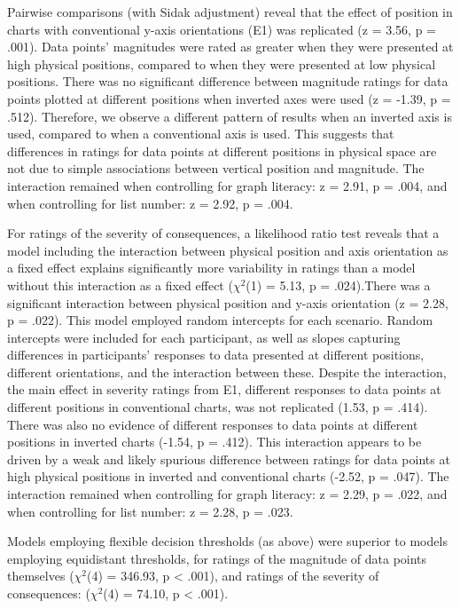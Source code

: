 \documentclass[journal]{vgtc}                %
\begin{document}
Pairwise comparisons (with Sidak adjustment) reveal that the effect of
position in charts with conventional y-axis orientations (E1) was
replicated (z = 3.56, p
= .001). Data points'
magnitudes were rated as greater when they were presented at high
physical positions, compared to when they were presented at low physical
positions. There was no significant difference between magnitude ratings
for data points plotted at different positions when inverted axes were
used (z = -1.39, p
= .512). Therefore, we
observe a different pattern of results when an inverted axis is used,
compared to when a conventional axis is used. This suggests that
differences in ratings for data points at different positions in
physical space are not due to simple associations between vertical
position and magnitude. The interaction remained when controlling for
graph literacy: z = 2.91, p
= .004, and when controlling for
list number: z = 2.92, p
= .004.

For ratings of the severity of consequences, a likelihood ratio test
reveals that a model including the interaction between physical position
and axis orientation as a fixed effect explains significantly more
variability in ratings than a model without this interaction as a fixed
effect (\(\chi^2\)(1) = 5.13, p
= .024).There was a significant
interaction between physical position and y-axis orientation (z =
2.28, p
= .022). This
model employed random intercepts for each scenario. Random intercepts
were included for each participant, as well as slopes capturing
differences in participants' responses to data presented at different
positions, different orientations, and the interaction between these.
Despite the interaction, the main effect in severity ratings from E1,
different responses to data points at different positions in
conventional charts, was not replicated
(1.53, p
= .414). There was also
no evidence of different responses to data points at different positions
in inverted charts (-1.54, p
= .412). This
interaction appears to be driven by a weak and likely spurious
difference between ratings for data points at high physical positions in
inverted and conventional charts (-2.52,
p = .047). The
interaction remained when controlling for graph literacy: z =
2.29, p
= .022, and when controlling for
list number: z = 2.28, p
= .023.

Models employing flexible decision thresholds (as above) were superior
to models employing equidistant thresholds, for ratings of the magnitude
of data points themselves (\(\chi^2\)(4) =
346.93, p \textless{} .001), and
ratings of the severity of consequences:
(\(\chi^2\)(4) = 74.10, p
\textless{} .001).
\end{document}
